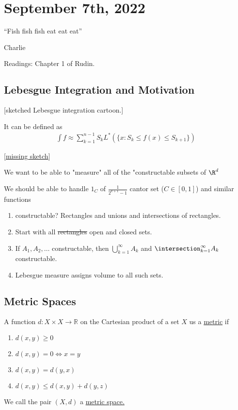 \section{September 7th, 2022}

\epigraph{``Fish fish fish eat eat eat''}{Charlie}

Readings: Chapter 1 of Rudin.

\subsection{Lebesgue Integration and Motivation}

[sketched Lebesgue integration cartoon.]

It can be defined as 
\begin{align*}
	\int f \approx \sum_{k=1}^{n-1} S_k L^* (\{x : S_k \leq f(x) \leq S_{k+1}\})
\end{align*} 

[\underline{missing sketch}]

We want to be able to "measure" all of the "constructable subsets of $\R^d$

We should be able to handle $1_C$ of $\frac{1}{2^{k+1} -1 }$ cantor set ($C \in [0,1]$) and similar functions

\begin{enumerate}
	\item constructable? Rectangles and unions and intersections of rectangles.
	\item Start with all \sout{rectangles} open and closed sets.
	\item If $A_1, A_2, \ldots$ constructable, then
		$\bigcup_{k=1}^{\infty}A_k$ and $\intersection_{k=1}^{\infty}A_k$ constructable.
	\item Lebesgue measure assigns volume to all such sets.
\end{enumerate}
 
\subsection{Metric Spaces}

\begin{definition}
	A function $d : X \times X \to \mathbb{R}$ on the Cartesian product of a set $X$ us a \underline{metric} if

\begin{enumerate}
	\item $d(x,y) \geq 0$
	\item $d(x,y) = 0 \iff x = y$
	\item $d(x,y) = d(y,x)$
	\item $d(x,y) \leq d(x,y) + d(y,z)$
\end{enumerate}

We call the pair $(X, d)$ a \underline{metric space.}
\end{definition}


